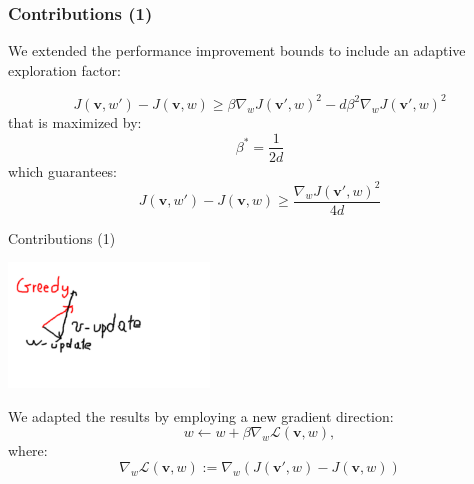 \documentclass{beamer}
\newcommand{\vtheta}{{\boldsymbol{\theta}}}
\newcommand{\vv}{\boldsymbol{v}}
\newcommand{\Deltav}{\mathcal{L}}
\newcommand{\gradDelta}[1][w]{\nabla_{#1}\Deltav}
\newenvironment{tightcenter}{%
  \setlength\topsep{0pt}
  \setlength\parskip{0pt}
  \begin{center}
}{%
  \end{center}
}
\begin{document}
%
%
%
%

\begin{frame}
\frametitle{Contributions (1)}
We extended the performance improvement bounds to include an adaptive exploration factor:

\[
J(\vv, w') - J(\vv, w) \geq \beta \nabla_w J(\vv',w)^2 - d \beta^2 \nabla_w J(\vv',w)^2
\]
that is maximized by:
\[
\beta^* = \frac{1}{2d}
\]
which guarantees:
\[
J(\vv, w') - J(\vv, w) \geq \frac{\nabla_w J(\vv',w)^2}{4d}
\]

\framebox{\begin{minipage}{4cm}\textbf{Recall:}\begin{tightcenter} $\vtheta = [ \vv ; w ]$ \end{tightcenter} \end{minipage}}



\end{frame}




\begin{frame}{Contributions (1)}
\begin{tightcenter}
\includegraphics[width=0.4\textwidth]{pictures/newgradient}
\end{tightcenter}

We adapted the results by employing a new gradient direction: 
\[
w \gets w + \beta \gradDelta(\vv, w),
\]
where: 
\[
\gradDelta(\vv, w) := \nabla_w \left( J(\vv', w) - J(\vv, w) \right)
\]
\end{frame}
\end{document}
